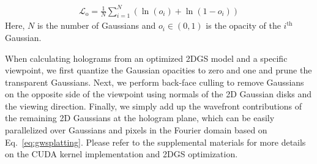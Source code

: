\begin{align}
    \mathcal{L}_\text{o} = \frac{1}{N} \sum_{i=1}^N (\ln(o_i) + \ln(1 - o_i))
    \label{eq:opacity_reg}
\end{align}
Here, $N$ is the number of Gaussians and $o_i \in (0, 1) $ is the opacity of the $i^\text{th}$ Gaussian.

When calculating holograms from an optimized 2DGS model and a specific viewpoint, we first quantize the Gaussian opacities to zero and one and prune the transparent Gaussians. Next, we perform back-face culling to remove Gaussians on the opposite side of the viewpoint using normals of the 2D Gaussian disks and the viewing direction. Finally, we simply add up the wavefront contributions of the remaining 2D Gaussians at the hologram plane, which can be easily parallelized over Gaussians and pixels in the Fourier domain based on Eq.~\ref{eq:gwsplatting}. Please refer to the supplemental materials for more details on the CUDA kernel implementation and 2DGS optimization.
\fi

